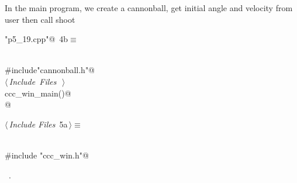 \documentclass{article}
\begin{document}
In the main program, we create a cannonball, get initial angle and velocity from user
then call shoot
\begin{flushleft} \small
\begin{minipage}{\linewidth}\label{scrap3}\raggedright\small
{} \verb@"p5_19.cpp"@\nobreak\ {\footnotesize {4b}}$\equiv$
\vspace{-1ex}
\begin{list}{}{} \item
\mbox{}\verb@@\\
\mbox{}\verb@#include"cannonball.h"@\\
\mbox{}\verb@@\hbox{$\langle\,${\it Include Files}\nobreak\ {\footnotesize {}}$\,\rangle$}\verb@@\\
\mbox{}\verb@int ccc_win_main()@\\
\mbox{}@\\
\mbox{}\verb@@{\NWsep}
\end{list}
\vspace{-1.5ex}
\footnotesize
\begin{list}{}{\setlength{\itemsep}{-\parsep}\setlength{\itemindent}{-\leftmargin}}

\item{}
\end{list}
\end{minipage}\vspace{4ex}
\end{flushleft}
\begin{flushleft} \small
\begin{minipage}{\linewidth}\label{scrap4}\raggedright\small
{} $\langle\,${\it Include Files}\nobreak\ {\footnotesize {5a}}$\,\rangle\equiv$
\vspace{-1ex}
\begin{list}{}{} \item
\mbox{}\verb@@\\
\mbox{}\verb@#include "ccc_win.h"@\\
\mbox{}\verb@@{\NWsep}
\end{list}
\vspace{-1.5ex}
\footnotesize
\begin{list}{}{\setlength{\itemsep}{-\parsep}\setlength{\itemindent}{-\leftmargin}}
\item \NWtxtMacroRefIn\ .

\item{}
\end{list}
\end{minipage}\vspace{4ex}
\end{flushleft}
\end{document}
